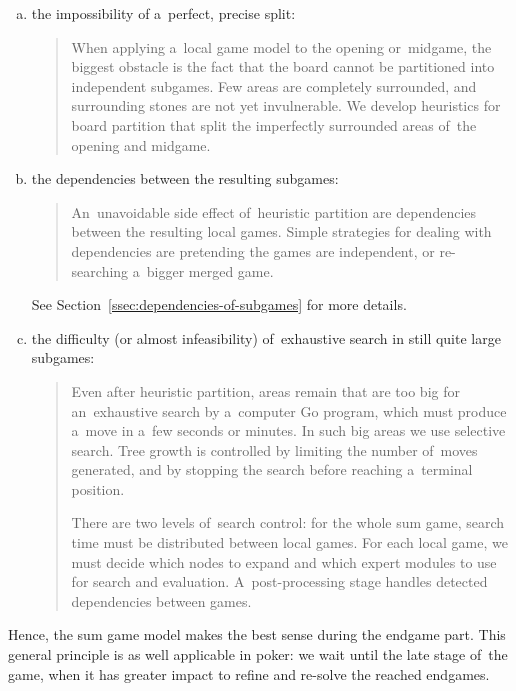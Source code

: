 \begin{enumerate}[(a)]
  \item the impossibility of a~perfect, precise split:
    \begin{quotation}
      When applying a~local game model to the opening or~midgame, the biggest obstacle is the fact that the board cannot be partitioned into independent subgames.
      Few areas are completely surrounded, and surrounding stones are not yet invulnerable.
      We develop heuristics for board partition that split the imperfectly surrounded areas of~the opening and midgame.
    \end{quotation}

  \item the dependencies between the resulting subgames: 
    \begin{quotation}
      An~unavoidable side effect of~heuristic partition are dependencies between the resulting local games.
      Simple strategies for dealing with dependencies are pretending the games are independent, or re-searching a~bigger merged game.
    \end{quotation}
    See Section~\ref{ssec:dependencies-of-subgames} for more details.

  \item the difficulty (or almost infeasibility) of~exhaustive search in still quite large subgames:
    \begin{quotation}
      Even after heuristic partition, areas remain that are too big for an~exhaustive search by a~computer Go program, which must produce a~move in a~few seconds or minutes.
      In such big areas we use selective search.
      Tree growth is controlled by limiting the number of~moves generated, and by stopping the search before reaching a~terminal position.

      There are two levels of~search control:
      for the whole sum game, search time must be distributed between local games.
      For each local game, we must decide which nodes to expand and which expert modules to use for search and evaluation.
      A~post-processing stage handles detected dependencies between games.
    \end{quotation}
\end{enumerate}

Hence, the sum game model makes the best sense during the endgame part.
This general principle is as well applicable in poker:
we wait until the late stage of~the game, when it has greater impact to refine and re-solve the reached endgames.

